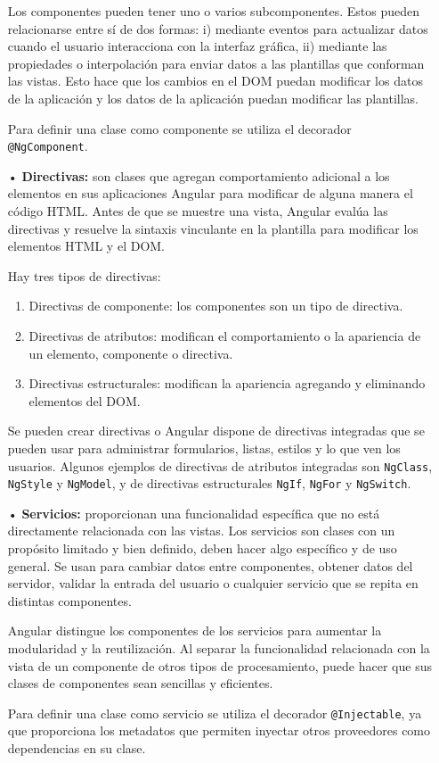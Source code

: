\documentclass[a4paper, 12pt]{book}
\begin{document}
\begin{itemize}
	Los componentes pueden tener uno o varios subcomponentes. Estos pueden relacionarse entre sí de dos formas: i) mediante eventos para actualizar datos cuando el usuario interacciona con la interfaz gráfica, ii) mediante las propiedades o interpolación para enviar datos a las plantillas que conforman las vistas. 
	Esto hace que los cambios en el DOM puedan modificar los datos de la aplicación y los datos de la aplicación puedan modificar las plantillas.
	
	Para definir una clase como componente se utiliza el decorador \texttt{@NgComponent}.
	
	\item[•] \textbf{Directivas:} son clases que agregan comportamiento adicional a los elementos en sus aplicaciones Angular para modificar de alguna manera el código HTML. 
	Antes de que se muestre una vista, Angular evalúa las directivas y resuelve la sintaxis vinculante en la plantilla para modificar los elementos HTML y el DOM.
	
	Hay tres tipos de directivas:
	
	\begin{enumerate}
	\item Directivas de componente: los componentes son un tipo de directiva.
	\item Directivas de atributos: modifican el comportamiento o la apariencia de un elemento, componente o directiva.
	\item Directivas estructurales: modifican la apariencia agregando y eliminando elementos del DOM.
	\end{enumerate}
	
	Se pueden crear directivas o Angular dispone de directivas integradas que se pueden usar para administrar formularios, listas, estilos y lo que ven los usuarios. 
	Algunos ejemplos de directivas de atributos integradas son \texttt{NgClass}, \texttt{NgStyle} y \texttt{NgModel}, y de directivas estructurales \texttt{NgIf}, \texttt{NgFor} y \texttt{NgSwitch}.
	
	\item[•] \textbf{Servicios:} proporcionan una funcionalidad específica que no está directamente relacionada con las vistas. Los servicios son clases con un propósito limitado y bien definido, deben hacer algo específico y de uso general. 
	Se usan para cambiar datos entre componentes, obtener datos del servidor, validar la entrada del usuario o cualquier servicio que se repita en distintas componentes.
	
	Angular distingue los componentes de los servicios para aumentar la modularidad y la reutilización. 
	Al separar la funcionalidad relacionada con la vista de un componente de otros tipos de procesamiento, puede hacer que sus clases de componentes sean sencillas y eficientes.
	
	Para definir una clase como servicio se utiliza el decorador \texttt{@Injectable}, ya que proporciona los metadatos que permiten inyectar otros proveedores como dependencias en su clase.
	
\end{itemize}
\end{document}
